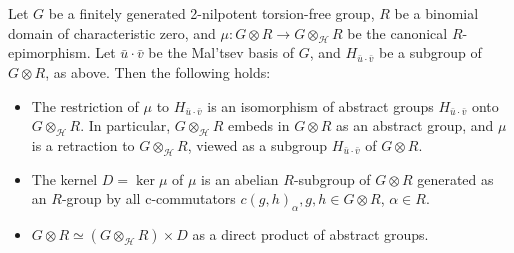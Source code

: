 \documentclass[10pt,a4paper]{amsart}
\begin{document}
\begin{theorem} \label{th:tensor-completions}
	Let $G$ be a finitely generated 2-nilpotent torsion-free group, $R$ be a binomial domain of characteristic zero, and $\mu:G \otimes R \to G \otimes_{\mathcal{H}} R$ be the canonical $R$-epimorphism. Let $\bar u \cdot \bar v$ be the Mal'tsev basis of $G$, and $H_{\bar u \cdot \bar v}$ be a subgroup of $G \otimes R$, as above. Then the following holds:
	\begin{itemize}
		\item [1)] The restriction of $\mu$ to $H_{\bar u \cdot \bar v}$ is an isomorphism of abstract groups $H_{\bar u \cdot \bar v}$ onto $G \otimes_{\mathcal{H}} R$. In particular, $G \otimes_{\mathcal{H}} R$ embeds in $G \otimes R$ as an abstract group, and $\mu$ is a retraction to $G \otimes_{\mathcal{H}} R$, viewed as a subgroup $H_{\bar u \cdot \bar v}$ of $G \otimes R$.
		\item [2)] The kernel $D = \ker \mu$ of $\mu$ is an abelian $R$-subgroup of $G \otimes R$ generated as an $R$-group by all c-commutators $c(g,h)_\alpha, g,h \in G \otimes R$, $\alpha \in R$.
		\item [3)] $G \otimes R \simeq (G \otimes_{\mathcal{H}} R) \times D$ as a direct product of abstract groups.
	\end{itemize}
\end{theorem}
\end{document}
